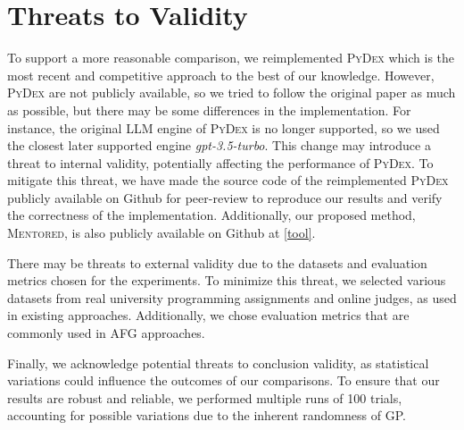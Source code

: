 \documentclass[10pt,conference]{IEEEtran}
\begin{document}
        

\section{Threats to Validity}
    To support a more reasonable comparison, we reimplemented \textsc{PyDex} which is the most recent and competitive approach to the best of our knowledge. However, \textsc{PyDex} are not publicly available, so we tried to follow the original paper as much as possible, but there may be some differences in the implementation. For instance, the original LLM engine of \textsc{PyDex} is no longer supported, so we used the closest later supported engine \textit{gpt-3.5-turbo}. This change may introduce a threat to internal validity, potentially affecting the performance of \textsc{PyDex}. To mitigate this threat, we have made the source code of the reimplemented \textsc{PyDex} publicly available on Github for peer-review to reproduce our results and verify the correctness of the implementation. Additionally, our proposed method, \textsc{Mentored}, is also publicly available on Github at \ref{tool}.

    There may be threats to external validity due to the datasets and evaluation metrics chosen for the experiments. To minimize this threat, we selected various datasets from real university programming assignments and online judges, as used in existing approaches. Additionally, we chose evaluation metrics that are commonly used in AFG approaches.

    Finally, we acknowledge potential threats to conclusion validity, as statistical variations could influence the outcomes of our comparisons. To ensure that our results are robust and reliable, we performed multiple runs of 100 trials, accounting for possible variations due to the inherent randomness of GP.
\end{document}
